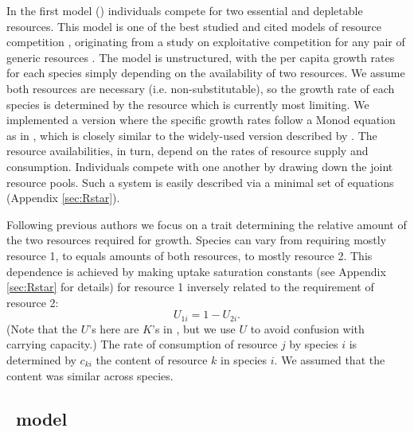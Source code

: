 \documentclass[a4paper,11pt]{article}
\begin{document}
In the first model (\Rstar) individuals compete for two essential and
depletable resources. This model is one of the best studied and cited
models of resource competition \citep{Tilman-1977, Tilman-1982,
  Huisman-2001}, originating from a study on exploitative competition
for any pair of generic resources \citep{Leon-1975}. The model is
unstructured, with the per capita growth rates for each species simply
depending on the availability of two resources.  We assume both
resources are necessary (i.e. non-substitutable), so the growth rate
of each species is determined by the resource which is currently most
limiting.  We implemented a version where the specific growth rates
follow a Monod equation as in \citet{Huisman-2001}, which is closely
similar to the widely-used version described by \citet{Tilman-1977,
  Tilman-1982}.  The resource availabilities, in turn, depend on the
rates of resource supply and consumption. Individuals compete with one
another by drawing down the joint resource pools. Such a system is
easily described via a minimal set of equations (Appendix
\ref{sec:Rstar}).

Following previous authors \citep{Tilman-1985, Schreiber-2003,
  Fox-2008} we focus on a trait determining the relative amount of the
two resources required for growth. Species can vary from requiring
mostly resource 1, to equals amounts of both resources, to mostly
resource 2. This dependence is achieved by making uptake saturation
constants (see Appendix \ref{sec:Rstar} for details) for resource 1
inversely related to the requirement of resource 2:
\begin{equation}
\label{eq:R3}
U_{1i} = 1 - U_{2i}.
\end{equation}
(Note that the $U$'s here are $K$'s in \citet{Huisman-2001}, but we
use $U$ to avoid confusion with carrying capacity.)
%
The rate of consumption of resource $j$ by species $i$ is determined by
$c_{ki}$ the content of resource $k$ in species $i$. We assumed that
the content was similar across species.

%

\subsection{\plant\ model}
\end{document}
